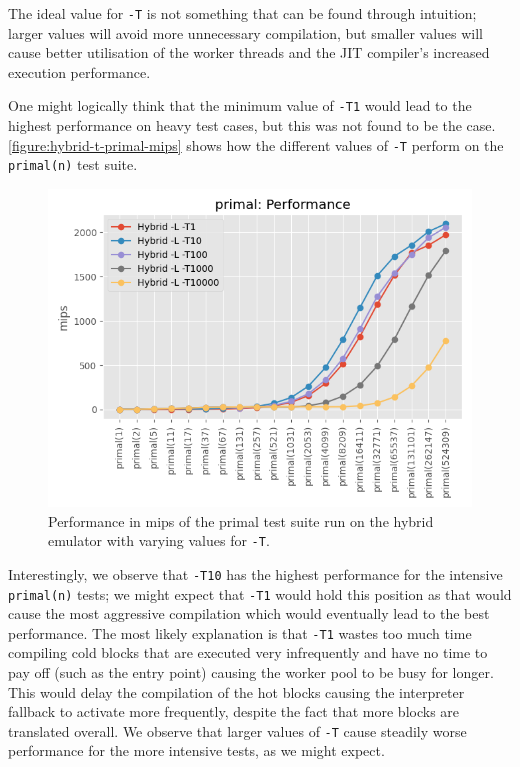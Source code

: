 
The ideal value for \texttt{-T} is not something that can be found through intuition; larger values will avoid more unnecessary compilation, but smaller values will cause better utilisation of the worker threads and the JIT compiler's increased execution performance.

One might logically think that the minimum value of \texttt{-T1} would lead to the highest performance on heavy test cases, but this was not found to be the case. \autoref{figure:hybrid-t-primal-mips} shows how the different values of \texttt{-T} perform on the \texttt{primal(n)} test suite.

\begin{figure}[H]
    \centering
    \includegraphics[scale=0.75]{output/graphs/tests/hybrid_t/primal/mips.png}
    \caption{Performance in mips of the primal test suite run on the hybrid emulator with varying values for \texttt{-T}.}
    \label{figure:hybrid-t-primal-mips}
\end{figure}

Interestingly, we observe that \texttt{-T10} has the highest performance for the intensive \texttt{primal(n)} tests; we might expect that \texttt{-T1} would hold this position as that would cause the most aggressive compilation which would eventually lead to the best performance. The most likely explanation is that \texttt{-T1} wastes too much time compiling cold blocks that are executed very infrequently and have no time to pay off (such as the entry point) causing the worker pool to be busy for longer. This would delay the compilation of the hot blocks causing the interpreter fallback to activate more frequently, despite the fact that more blocks are translated overall. We observe that larger values of \texttt{-T} cause steadily worse performance for the more intensive tests, as we might expect.

